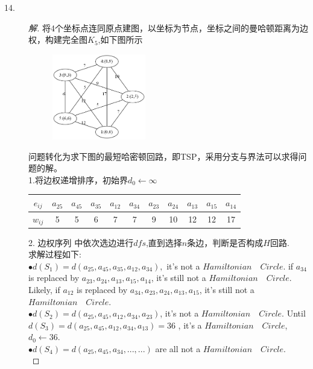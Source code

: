 \documentclass[UTF8, onecolumn, a4paper]{article}
\begin{document}
\begin{description}
\item[14.]
\begin{proof}[解]
将4个坐标点连同原点建图，以坐标为节点，坐标之间的曼哈顿距离为边权，构建完全图$K_5$,如下图所示\\
\begin{figure}[h]
	\centering
	\includegraphics[width=0.4\textwidth]{demo3.png}
\end{figure}
问题转化为求下图的最短哈密顿回路，即TSP，采用分支与界法可以求得问题的解。\\
1.将边权递增排序，初始界$d_0\leftarrow\infty$\\
\begin{center}
	\begin{tabular}{ccccccccccc}
		\hline
		$e_{ij}$ & $a_{25}$ & $a_{45}$ & $a_{35}$ &  $a_{12}$ & $a_{34}$ & $a_{23}$ & $a_{24}$ & $a_{13}$ & $a_{15}$ & $a_{14}$ \\
		\hline
		$w_{ij}$& 5 & 5 & 6 & 7 & 7 & 9 & 10 & 12 & 12 & 17\\
		\hline
	\end{tabular}
\end{center}
2. 边权序列 中依次选边进行$dfs$,直到选择$n$条边，判断是否构成$H$回路.
\\求解过程如下:\\
$\bullet$\quad$d(S_1) = d(a_{25}, a_{45}, a_{35}, a_{12}, a_{34}),$ it's not a $Hamiltonian\quad Circle$. if $a_{34}$ is replaced by $a_{23}, a_{24}, a_{13}, a_{15}, a_{14}$, it's still not a $Hamiltonian\quad Circle$. Likely, if $a_{12}$ is replaced by $a_{34} ,a_{23}, a_{24}, a_{13}, a_{15}$, it's still not a $Hamiltonian\quad Circle$.\\
$\bullet$\quad$ d(S_2) = d(a_{25}, a_{45}, a_{12}, a_{34}, a_{23})$, it's not a $Hamiltonian\quad Circle$. Until\\ $d(S_3) = d(a_{25}, a_{45}, a_{12}, a_{34}, a_{13}) = 36$ , it's a $Hamiltonian\quad Circle$, $d_0\leftarrow36$.\\
$\bullet$\quad$d(S_4) = d(a_{25}, a_{45}, a_{34}, ..., ...)$ are all not a  $Hamiltonian\quad Circle$.\\

\end{proof}
\end{description}
\end{document}
